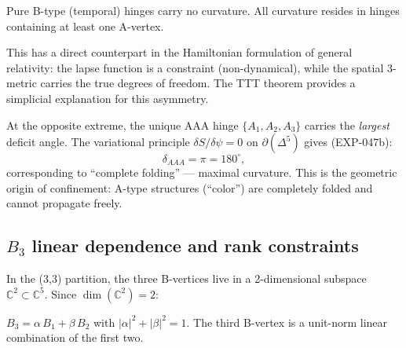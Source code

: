 \begin{corollary}
Pure B-type (temporal) hinges carry no curvature.  All curvature resides in hinges containing at least one A-vertex.
\end{corollary}

\begin{remark}
This has a direct counterpart in the Hamiltonian formulation of general relativity: the lapse function is a constraint (non-dynamical), while the spatial 3-metric carries the true degrees of freedom.  The TTT theorem provides a simplicial explanation for this asymmetry.
\end{remark}

At the opposite extreme, the unique AAA hinge $\{A_1, A_2, A_3\}$ carries the \emph{largest} deficit angle.  The variational principle $\delta S/\delta\psi = 0$ on $\partial(\Delta^5)$ gives (EXP-047b):
\begin{equation}
\delta_{AAA} = \pi = 180^\circ,
\end{equation}
corresponding to ``complete folding'' --- maximal curvature.  This is the geometric origin of confinement: A-type structures (``color'') are completely folded and cannot propagate freely.

\subsection{$B_3$ linear dependence and rank constraints}
\label{sec:B3_dependence}

In the (3,3) partition, the three B-vertices live in a 2-dimensional subspace $\mathbb{C}^2 \subset \mathbb{C}^5$.  Since $\dim(\mathbb{C}^2) = 2$:

\begin{proposition}[$B_3$ dependence]
\label{prop:B3}
$B_3 = \alpha\, B_1 + \beta\, B_2$ with $|\alpha|^2 + |\beta|^2 = 1$.  The third B-vertex is a unit-norm linear combination of the first two.
\end{proposition}


